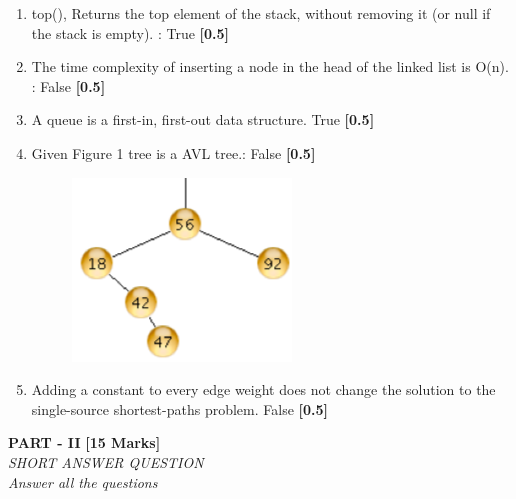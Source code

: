 \documentclass[12pt ,a4paper]{exam}
\begin{document}
	\begin{enumerate}[start=16,label={\bfseries Q\arabic*)}]
			\itemsep-0.3em
		\item top(), Returns the top element of the stack, without removing it (or null if the stack is empty). : True \hfill\textbf{ [0.5]}
		\item The time complexity of inserting a node in the head of the linked list is O(n). : False \hfill\textbf{ [0.5]}
		\item A queue is a first-in, first-out data structure. True \hfill\textbf{ [0.5]}
		\item Given Figure 1 tree is a AVL tree.: False \hfill\textbf{ [0.5]}
		\begin{figure}[h]
			\centering
			\includegraphics[width=0.4\linewidth]{"Screenshot 2020-12-27 at 1.12.12 PM"}
		\end{figure}
	    \item Adding a constant to every edge weight does not change the solution to the single-source shortest-paths problem. False \hfill\textbf{ [0.5]}
	\end{enumerate}
	
	\vspace{0.1mm}
	\pagebreak
	\begin{center}
		\textbf{PART - II} \textbf{[15 Marks]}\\
		\noindent \textit{SHORT ANSWER QUESTION} \\
		\noindent \textit{Answer all the questions} 
	\end{center}
\end{document}
